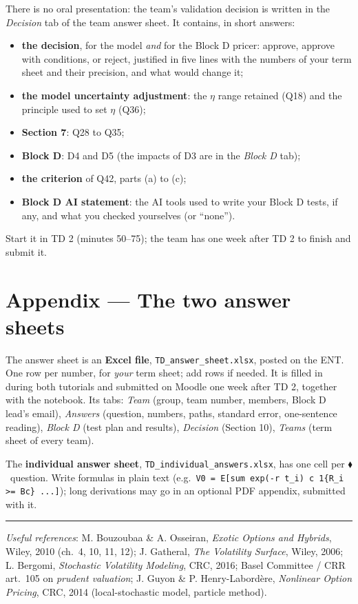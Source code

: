 \documentclass[11pt,a4paper]{article}
\newcommand{\indiv}{\textcolor{indivred}{$\blacklozenge$}}
\begin{document}
There is no oral presentation: the team's validation decision is written in the \emph{Decision} tab of the team
answer sheet. It contains, in short answers:
\begin{itemize}
  \item \textbf{the decision}, for the model \emph{and} for the Block D pricer: approve, approve with conditions, or
  reject, justified in five lines with the numbers of your term sheet and their precision, and what
  would change it;
  \item \textbf{the model uncertainty adjustment}: the $\eta$ range retained (Q18) and the principle used to set
  $\eta$ (Q36);
  \item \textbf{Section 7}: Q28 to Q35;
  \item \textbf{Block D}: D4 and D5 (the impacts of D3 are in the \emph{Block D} tab);
  \item \textbf{the criterion} of Q42, parts (a) to (c);
  \item \textbf{Block D AI statement}: the AI tools used to write your Block D tests, if any, and what you
  checked yourselves (or ``none'').
\end{itemize}
Start it in TD 2 (minutes 50--75); the team has one week after TD 2 to finish and submit it.

\section*{Appendix --- The two answer sheets}

The answer sheet is an \textbf{Excel file}, \texttt{TD\_answer\_sheet.xlsx}, posted on the ENT. One row per number,
for \emph{your} term sheet; add rows if needed. It is filled in during both tutorials and submitted on Moodle
one week after TD 2, together with the notebook. Its tabs: \emph{Team} (group, team number, members,
Block D lead's email), \emph{Answers} (question, numbers, paths, standard error, one-sentence reading),
\emph{Block D} (test plan and results), \emph{Decision} (Section 10), \emph{Teams} (term sheet of every team).

The \textbf{individual answer sheet}, \texttt{TD\_individual\_answers.xlsx}, has one cell per \indiv\ question. Write
formulas in plain text (e.g.\ \texttt{V0 = E[sum exp(-r t\_i) c 1\{R\_i >= Bc\} ...]}); long derivations may
go in an optional PDF appendix, submitted with it.

\vspace{2em}
\noindent\rule{\textwidth}{0.4pt}
{\small\emph{Useful references}: M. Bouzoubaa \& A. Osseiran, \emph{Exotic Options and Hybrids}, Wiley, 2010 (ch.\ 4, 10, 11, 12);
J. Gatheral, \emph{The Volatility Surface}, Wiley, 2006; L. Bergomi, \emph{Stochastic Volatility Modeling}, CRC, 2016; Basel
Committee / CRR art.\ 105 on \emph{prudent valuation}; J. Guyon \& P. Henry-Labordère, \emph{Nonlinear Option Pricing},
CRC, 2014 (local-stochastic model, particle method).\par}
\end{document}
